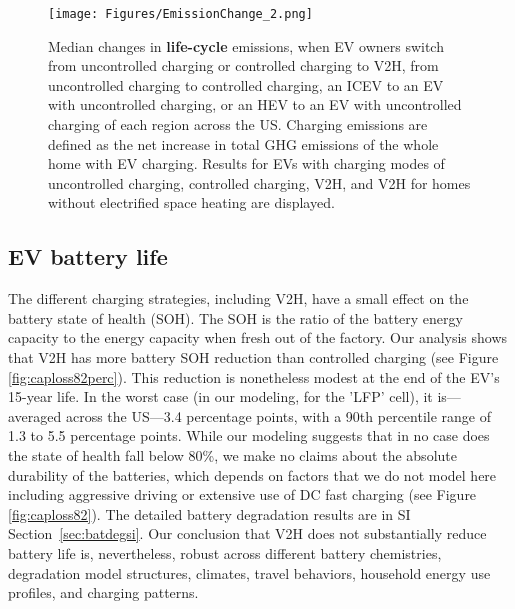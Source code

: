 \documentclass[11pt,preprint]{elsarticle}
\begin{document}
\begin{figure*}[!ht]
    \centering
    \texttt{[image: Figures/EmissionChange\_2.png]}
    \caption{Median changes in \textbf{life-cycle} emissions, when EV owners switch from uncontrolled charging or controlled charging to V2H, from uncontrolled charging to controlled charging, an ICEV to an EV with uncontrolled charging, or an HEV to an EV with uncontrolled charging of each region across the US. Charging emissions are defined as the net increase in total GHG emissions of the whole home with EV charging. Results for EVs with charging modes of uncontrolled charging, controlled charging, V2H, and V2H for homes without electrified space heating are displayed.}
    \label{fig:emissionchange}
\end{figure*}

\subsection{EV battery life}

The different charging strategies, including V2H, have a small effect on the battery state of health (SOH). The SOH is the ratio of the battery energy capacity to the energy capacity when fresh out of the factory. Our analysis shows that V2H has more battery SOH reduction than controlled charging (see Figure \ref{fig:caploss82perc}). This reduction is nonetheless modest at the end of the EV's 15-year life. In the worst case (in our modeling, for the 'LFP' cell), it is—averaged across the US—3.4 percentage points, with a 90th percentile range of 1.3 to 5.5 percentage points. While our modeling suggests that in no case does the state of health fall below 80\%, we make no claims about the absolute durability of the batteries, which depends on factors that we do not model here including aggressive driving or extensive use of DC fast charging (see Figure \ref{fig:caploss82}). The detailed battery degradation results are in SI Section~\ref{sec:batdegsi}. Our conclusion that V2H does not substantially reduce battery life is, nevertheless, robust across different battery chemistries, degradation model structures, climates, travel behaviors, household energy use profiles, and charging patterns. 
\end{document}
